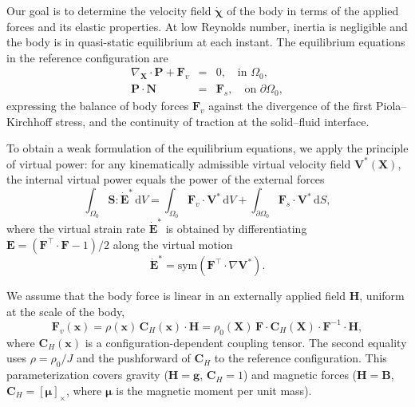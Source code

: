 \documentclass[aps,prfluids,groupedaddress]{revtex4-2}
\newcommand{\rmd}{\mathrm{d}}
\newcommand{\sym}{\mathrm{sym}}
\newcommand{\bg}{\bm{g}}
\newcommand{\bx}{\bm{x}}
\newcommand{\bmu}{\bm{\mu}}
\newcommand{\bB}{\bm{B}}
\newcommand{\bF}{\bm{F}}
\newcommand{\bH}{\bm{H}}
\newcommand{\bN}{\bm{N}}
\newcommand{\bV}{\bm{V}}
\newcommand{\bX}{\bm{X}}
\newcommand{\tI}{\bm{\mathit{1}}}
\newcommand{\tC}{\bm{{C}}}
\newcommand{\tE}{\bm{{E}}}
\newcommand{\tEd}{\bm{\dot {E}}}
\newcommand{\tF}{\bm{{F}}}
\newcommand{\tP}{\bm{{P}}}
\newcommand{\tS}{\bm{{S}}}
\newcommand{\bxd}{\bm{\dot \chi}}
\begin{document}
Our goal is to determine the velocity field $\bxd$ of the body in terms of the applied forces and its elastic properties. At low Reynolds number, inertia is negligible and the body is in quasi-static equilibrium at each instant. The equilibrium equations in the reference configuration are
\begin{eqnarray}
\nabla_{\bX}\cdot \tP + \bF_v & = & 0, \quad \mbox{in }\Omega_0,\\
\tP \cdot \bN & = & \bF_s, \quad \mbox{on }\partial\Omega_0,
\end{eqnarray}
expressing the balance of body forces $\bF_v$ against the divergence of the first Piola–Kirchhoff stress, and the continuity of traction at the solid--fluid interface.

To obtain a weak formulation of the equilibrium equations, we apply the principle of virtual power: for any kinematically admissible virtual velocity field $\bV^*(\bX)$, the internal virtual power equals the power of the external forces
\begin{equation}\label{eq:virtual_power}
\int_{\Omega_0} \tS : \tEd^* \, \rmd V =
	\int_{\Omega_0} \bF_v \cdot \bV^* \, \rmd V +
	\int_{\partial \Omega_0} \bF_s \cdot \bV^* \, \rmd S,
\end{equation}
where the virtual strain rate $\tEd^*$ is obtained by differentiating $\tE = (\tF^\top\cdot\tF - \tI)/2$ along the virtual motion
\begin{equation}\label{eq:virtual_strain_rate}
\tEd^* = \sym\left(\tF^\top \cdot \nabla \bV^* \right).
\end{equation}

We assume that the body force is linear in an externally applied field $\bH$, uniform at the scale of the body,
\begin{equation}
\bF_v(\bx) = \rho(\bx)\,\tC_H(\bx) \cdot \bH
            = \rho_0(\bX)\,\tF \cdot \tC_H(\bX) \cdot \tF^{-1} \cdot \bH,
\end{equation}
where $\tC_H(\bx)$ is a configuration-dependent coupling tensor. The second equality uses $\rho = \rho_0/J$ and the pushforward of $\tC_H$ to the reference configuration. This parameterization covers gravity ($\bH = \bg$, $\tC_H = \tI$) and magnetic forces ($\bH = \bB$, $\tC_H = [\bmu]_\times$, where $\bmu$ is the magnetic moment per unit mass).
\end{document}
